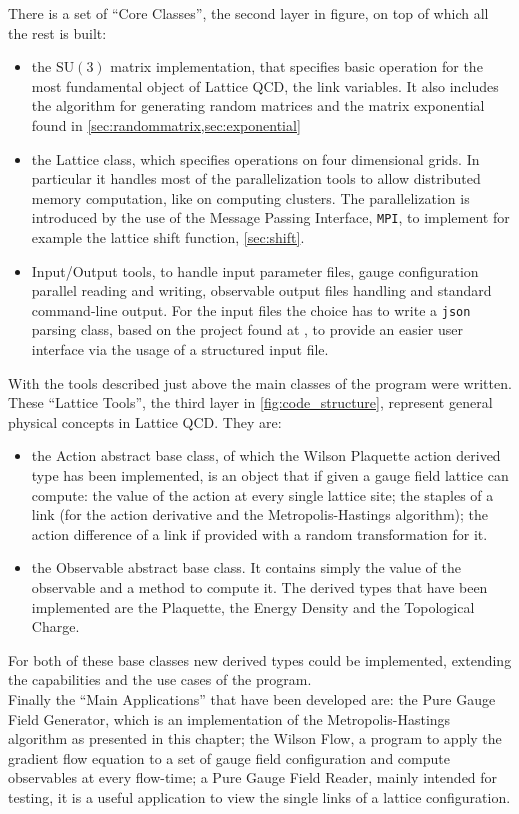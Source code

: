 
There is a set of ``Core Classes'', the second layer in figure, on top of which all the rest is built:
\begin{itemize} 
    \item the $\mathrm{SU}(3)$ matrix implementation, that specifies basic operation for the most fundamental object of Lattice QCD, the link variables. It also includes the algorithm for generating random matrices and the matrix exponential found in \cref{sec:randommatrix,sec:exponential} 
    \item the Lattice class, which specifies operations on four dimensional grids. In particular it handles most of the parallelization tools to allow distributed memory computation, like on computing clusters. The parallelization is introduced by the use of the Message Passing Interface, \texttt{MPI}, to implement for example the lattice shift function, \cref{sec:shift}.
    \item Input/Output tools, to handle input parameter files, gauge configuration parallel reading and writing, observable output files handling and standard command-line output. For the input files the choice has to write a \texttt{json} parsing class, based on the project found at \cite{_nlohmann/json}, to provide an easier user interface via the usage of a  structured input file.
\end{itemize}

With the tools described just above the main classes of the program were written. These ``Lattice Tools'', the third layer in \cref{fig:code_structure}, represent general physical concepts in Lattice QCD. They are:
\begin{itemize}
    \item the Action abstract base class, of which the Wilson Plaquette action derived type has been implemented, is an object that if given a gauge field lattice can compute: the value of the action at every single lattice site; the staples of a link (for the action derivative and the Metropolis-Hastings algorithm); the action difference of a link if provided with a random transformation for it.
    \item the Observable abstract base class. It contains simply the value of the observable and a method to compute it. The derived types that have been implemented are the Plaquette, the Energy Density and the Topological Charge.  
\end{itemize}
For both of these base classes new derived types could be implemented, extending the capabilities and the use cases of the program. \\
Finally the ``Main Applications'' that have been developed are: the Pure Gauge Field Generator, which is an implementation of the Metropolis-Hastings algorithm as presented in this chapter; the Wilson Flow, a program to apply the gradient flow equation to a set of gauge field configuration and compute observables at every flow-time; a Pure Gauge Field Reader, mainly intended for testing, it is a useful application to view the single links of a lattice configuration.